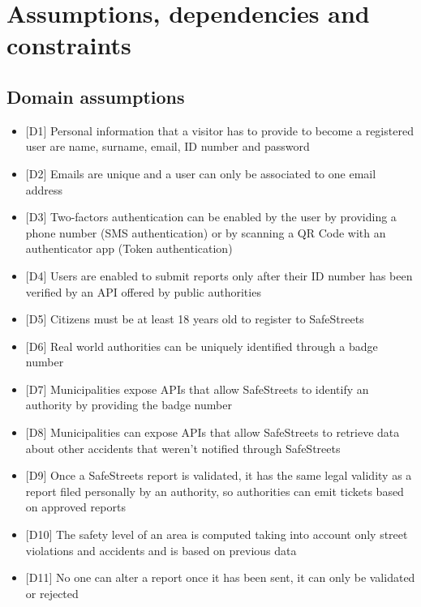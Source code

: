 \section{Assumptions, dependencies and constraints}

\subsection{Domain assumptions}
  \begin{itemize}
    \item $[$D1$]$ Personal information that a visitor has to provide to become a registered user are name, surname, email, ID number and password
    \item $[$D2$]$ Emails are unique and a user can only be associated to one email address
    \item $[$D3$]$ Two-factors authentication can be enabled by the user by providing a phone number (SMS authentication) or by scanning a QR Code with an authenticator app (Token authentication)
    \item $[$D4$]$ Users are enabled to submit reports only after their ID number has been verified by an API offered by public authorities
    \item $[$D5$]$ Citizens must be at least 18 years old to register to SafeStreets
    \item $[$D6$]$ Real world authorities can be uniquely identified through a badge number
    \item $[$D7$]$ Municipalities expose APIs that allow SafeStreets to identify an authority by providing the badge number
    \item $[$D8$]$ Municipalities can expose APIs that allow SafeStreets to retrieve data about other accidents that weren't notified through SafeStreets
    \item $[$D9$]$ Once a SafeStreets report is validated, it has the same legal validity as a report filed personally by an authority, so authorities can emit tickets based on approved reports
    \item $[$D10$]$ The safety level of an area is computed taking into account only street violations and accidents and is based on previous data
    \item $[$D11$]$ No one can alter a report once it has been sent, it can only be validated or rejected
  \end{itemize}

